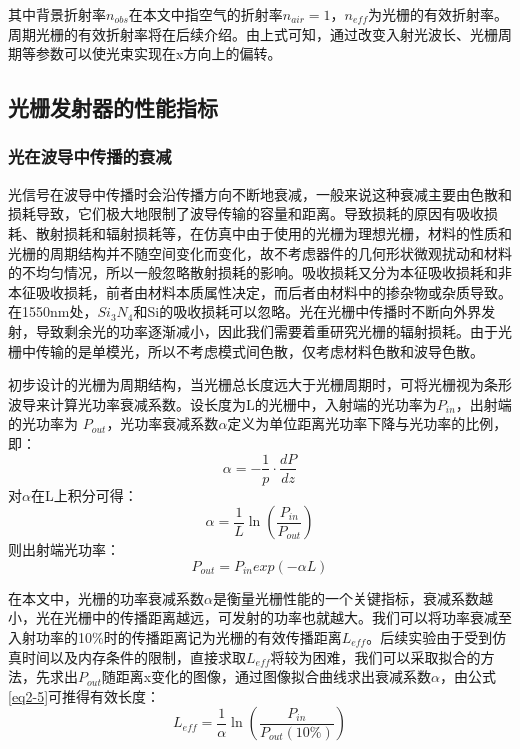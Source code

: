 \documentclass[UTF8,a4paper,12pt]{ctexart}
\numberwithin{equation}{section}
\begin{document}
其中背景折射率$n_{obs}$在本文中指空气的折射率$n_{air}=1$，$n_{eff}$为光栅的有效折射率。周期光栅的有效折射率将在后续介绍。由上式可知，通过改变入射光波长、光栅周期等参数可以使光束实现在x方向上的偏转。









\subsection{光栅发射器的性能指标}
\subsubsection{光在波导中传播的衰减}
光信号在波导中传播时会沿传播方向不断地衰减，一般来说这种衰减主要由色散和损耗导致，它们极大地限制了波导传输的容量和距离。导致损耗的原因有吸收损耗、散射损耗和辐射损耗等，在仿真中由于使用的光栅为理想光栅，材料的性质和光栅的周期结构并不随空间变化而变化，故不考虑器件的几何形状微观扰动和材料的不均匀情况，所以一般忽略散射损耗的影响。吸收损耗又分为本征吸收损耗和非本征吸收损耗，前者由材料本质属性决定，而后者由材料中的掺杂物或杂质导致。在1550nm处，$Si_3N_4$和Si的吸收损耗可以忽略。光在光栅中传播时不断向外界发射，导致剩余光的功率逐渐减小，因此我们需要着重研究光栅的辐射损耗。由于光栅中传输的是单模光，所以不考虑模式间色散，仅考虑材料色散和波导色散。

初步设计的光栅为周期结构，当光栅总长度远大于光栅周期时，可将光栅视为条形波导来计算光功率衰减系数。设长度为L的光栅中，入射端的光功率为$P_{in}$，出射端的光功率为 $P_{out}$，光功率衰减系数$\alpha$定义为单位距离光功率下降与光功率的比例，即：
\begin{equation}
    \alpha = -\frac{1}{p} \cdot \frac{dP}{dz}
    \label{eq2-3}
\end{equation}
对$\alpha$在L上积分可得：
\begin{equation}
    \alpha = \frac{1}{L}\ln{(\frac{P_{in}}{P_{out}})}
    \label{eq2-4}
\end{equation}
则出射端光功率：
\begin{equation}
    P_{out} = P_{in}exp(-\alpha L)
    \label{eq2-5}
\end{equation}

在本文中，光栅的功率衰减系数$\alpha$是衡量光栅性能的一个关键指标，衰减系数越小，光在光栅中的传播距离越远，可发射的功率也就越大。我们可以将功率衰减至入射功率的10\%时的传播距离记为光栅的有效传播距离$L_{eff}$。后续实验由于受到仿真时间以及内存条件的限制，直接求取$L_{eff}$将较为困难，我们可以采取拟合的方法，先求出$P_{out}$随距离x变化的图像，通过图像拟合曲线求出衰减系数$\alpha$，由公式\ref{eq2-5}可推得有效长度：
\begin{equation}
    L_{eff} = \frac{1}{\alpha}\ln{(\frac{P_{in}}{P_{out}(10\%)})}
    \label{eq2-6}
\end{equation}
\end{document}

